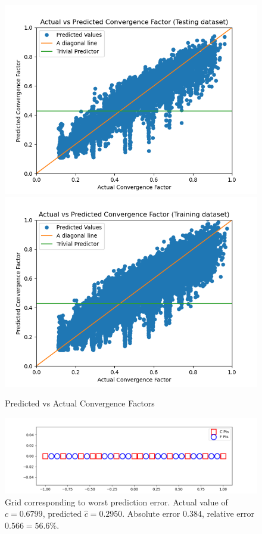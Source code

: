 \begin{figure}[h]
  \centering
  \includegraphics[scale=0.7]{figures/jacobi-conv/conv_test_pred.png}
  \includegraphics[scale=0.7]{figures/jacobi-conv/conv_train_pred.png}
  \caption{Predicted vs Actual Convergence Factors}
  \label{fig:conv_preds}
\end{figure}

\begin{figure}[h]
  \centering
  \includegraphics[scale=0.7]{figures/jacobi-conv/conv_peak_worst_err.png}
  \caption{Grid corresponding to worst prediction error.  Actual value of $c=0.6799$, predicted $\hat{c} = 0.2950$.  Absolute error $0.384$, relative error $0.566=56.6\%$.}
  \label{fig:worst}
\end{figure}

